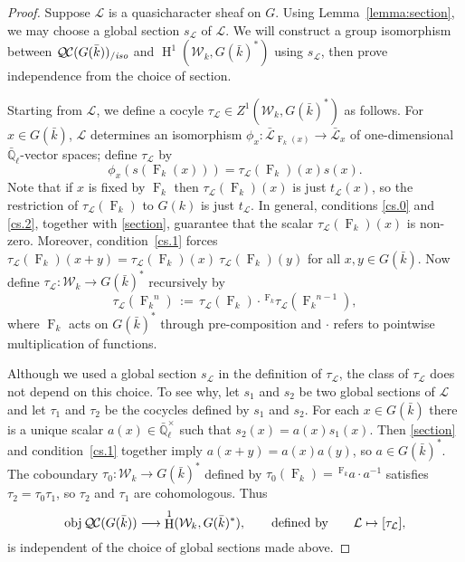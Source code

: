 \documentclass[11pt]{amsart}
\theoremstyle{plain}
\theoremstyle{definition}
\theoremstyle{remark}
\newcommand{\EE}{\mathbb{\bar Q}_\ell}
\newcommand{\bFq}{\bar{k}}
\newcommand{\Fq}{k}
\newcommand{\EEx}{\EE^\times}
\newcommand{\Frob}[1]{{\operatorname{F}_{#1}}}
\DeclareMathOperator{\Hh}{H}
\newcommand{\ceq}{{\, :=\, }}
\newcommand{\obj}{{\text{obj}\, }}
\newcommand{\cs}[1]{{\mathcal{#1}}}
\newcommand{\gcs}[1]{{\mathcal{\bar #1}}}
\newcommand{\QC}{{\mathcal{Q\hskip-0.8pt C}}}
\newcommand{\QCiso}[1]{\QC(#1)_{/\textit{iso}}}
\newcommand{\Weil}[1]{\mathcal{W}_{#1}}
\begin{document}
\begin{proof}
  Suppose $\cs{L}$ is a quasicharacter sheaf on $G$.  Using Lemma~\ref{lemma:section}, we may choose a global section $s_{\cs{L}}$
  of $\cs{L}$.  We will construct a group isomorphism between $\QCiso{G(\bFq)}$ and
  $\Hh^1(\Weil{\Fq}, G(\bFq)^*)$ using $s_{\cs{L}}$, then prove independence from the choice of section.

  Starting from $\cs{L}$, we define a cocyle $\tau_{\cs{L}} \in Z^1(\Weil{\Fq},G(\bFq)^*)$ as follows.
  For $x \in G(\bFq)$, $\cs{L}$ determines an isomorphism $\phi_x : \gcs{L}_{\Frob{\Fq}(x)} \to \gcs{L}_x$
  of one-dimensional $\EE$-vector spaces; define $\tau_\cs{L}$ by
  \begin{equation}\label{t}
   \phi_{x}(s(\Frob{\Fq}(x))) = \tau_\cs{L}(\Frob{\Fq})(x) s(x).
  \end{equation}
  Note that if $x$ is fixed by $\Frob{k}$ then $\tau_\cs{L}(\Frob{\Fq})(x)$ is just $t_\cs{L}(x)$, so the restriction of
  $\tau_\cs{L}(\Frob{k})$ to $G(k)$ is just $t_\cs{L}$.
  In general, conditions \ref{cs.0} and \ref{cs.2}, together with \eqref{section}, guarantee that
  the scalar $\tau_\cs{L}(\Frob{k})(x)$ is non-zero.  Moreover, condition~\ref{cs.1} forces
  $\tau_\cs{L}(\Frob{\Fq})(x+y) = \tau_\cs{L}(\Frob{\Fq})(x) \ \tau_\cs{L}(\Frob{\Fq})(y)$
  for all $x,y \in G(\bFq)$.  Now define $\tau_\cs{L} : \Weil{\Fq} \to G(\bFq)^*$ recursively by
  \[
   \tau_\cs{L}(\Frob{\Fq}^n) \ceq \tau_\cs{L}(\Frob{\Fq})\cdot \,^\Frob{\Fq} \tau_\cs{L}(\Frob{\Fq}^{n-1}),
  \]
  where $\Frob{\Fq}$ acts on $G(\bFq)^*$ through pre-composition and $\cdot$ refers
  to pointwise multiplication of functions.

  Although we used a global section $s_\cs{L}$ in the definition of
  $\tau_\cs{L}$, the class of $\tau_\cs{L}$ does not depend on this
  choice. To see why, let $s_1$ and $s_2$ be two global sections of
  $\cs{L}$ and let $\tau_1$ and $\tau_2$ be the cocycles defined by $s_1$ and $s_2$.
  For each $x \in G(\bFq)$ there is a unique scalar
  $a(x) \in \EEx$ such that $s_2(x) = a(x) s_1(x)$. Then \eqref{section} and
  condition~\ref{cs.1} together imply $a(x+y) = a(x)a(y)$, so
  $a\in G(\bFq)^*$.  The coboundary $\tau_0 : \Weil{\Fq} \to G(\bFq)^*$
  defined by $\tau_0(\Frob{\Fq}) = \,^\Frob{\Fq} a \cdot a^{-1}$ satisfies $\tau_2 = \tau_0 \tau_1$,
  so $\tau_2$ and $\tau_1$ are cohomologous. Thus
  \begin{equation}\label{cohomologous}
    \obj \QC(G(\bFq)) \longrightarrow \Hh^1(\Weil{\Fq},G(\bFq)^*),
    \qquad \text{defined by} \qquad \cs{L} \mapsto [\tau_\cs{L}],
  \end{equation}
  is independent of the choice of global sections made above.


\end{proof}
\end{document}

